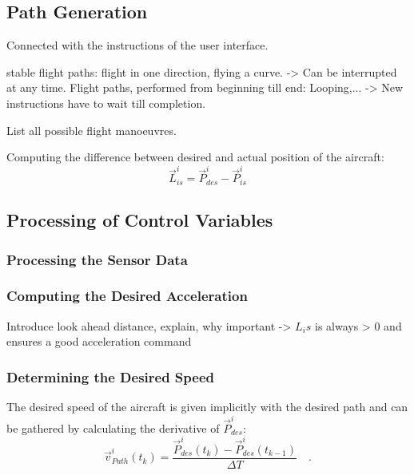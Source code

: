 \documentclass[11pt,a4paper]{scrartcl}		%
\begin{document}
\medskip




\subsection{Path Generation}

Connected with the instructions of the user interface.

stable flight paths: flight in one direction, flying a curve. -> Can be interrupted at any time.
Flight paths, performed from beginning till end: Looping,... -> New instructions have to wait till completion.

List all possible flight manoeuvres.

Computing the difference between desired and actual position of the aircraft:
\begin{equation}
\vec{L}_{is}^i = \vec{P}_{des}^i - \vec{P}_{is}^i
\end{equation}

\medskip





\subsection{Processing of Control Variables}

\subsubsection*{Processing the Sensor Data}

\subsubsection*{Computing the Desired Acceleration}

Introduce look ahead distance, explain, why important -> $L_is$ is always > 0 and ensures a good acceleration command

\subsubsection*{Determining the Desired Speed}\label{ch-Determ-Desired-Speed}

The desired speed of the aircraft is given implicitly with the desired path and can be gathered by calculating the derivative of $\vec{P}_{des}^i$:
\begin{equation}
\vec{v}_{Path}^i(t_k) = \frac{\vec{P}_{des}^i(t_k)-\vec{P}_{des}^i(t_{k-1})}{\Delta T}\quad .
\end{equation}
\end{document}

